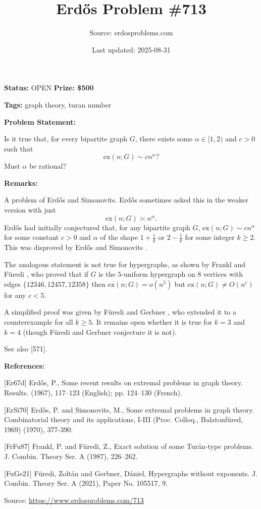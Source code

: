 \documentclass{article}
\title{Erd\H{o}s Problem \#713}
\date{Last updated: 2025-08-31}
\author{Source: erdosproblems.com}
\begin{document}
\maketitle

\noindent\textbf{Status:} OPEN \quad \textbf{Prize: \$500}

\noindent\textbf{Tags:} graph theory, turan number

\medskip
\noindent\textbf{Problem Statement:}

Is it true that, for every bipartite graph $G$, there exists some $\alpha\in [1,2)$ and $c>0$ such that\[\mathrm{ex}(n;G)\sim cn^\alpha?\]Must $\alpha$ be rational?

\bigskip
\noindent\textbf{Remarks:}

A problem of Erd\H{o}s and Simonovits. Erd\H{o}s sometimes asked this in the weaker version with just\[\mathrm{ex}(n;G)\asymp n^{\alpha}.\]Erd\H{o}s \cite{Er67d} had initially conjectured that, for any bipartite graph $G$, $\mathrm{ex}(n;G)\sim cn^{\alpha}$ for some constant $c>0$ and $\alpha$ of the shape $1+\frac{1}{k}$ or $2-\frac{1}{k}$ for some integer $k\geq 2$. This was disproved by Erd\H{o}s and Simonovits \cite{ErSi70}.

The analogous statement is not true for hypergraphs, as shown by Frankl and F\"{u}redi \cite{FrFu87}, who proved that if $G$ is the $5$-uniform hypergraph on $8$ vertices with edges $\{12346,12457,12358\}$ then $\mathrm{ex}(n;G)=o(n^5)$ but $\mathrm{ex}(n;G)\neq O(n^c)$ for any $c<5$.

A simplified proof was given by F\"{u}redi and Gerbner \cite{FuGe21}, who extended it to a counterexample for all $k\geq 5$. It remains open whether it is true for $k=3$ and $k=4$ (though F\"{u}redi and Gerbner conjecture it is not).

See also [571].

\bigskip
\noindent\textbf{References:}

[Er67d] Erd\H{o}s, P., Some recent results on extremal problems in graph theory.
{R}esults. (1967), 117--123 (English); pp. 124--130 (French).
 
 [ErSi70] Erd\H{o}s, P. and Simonovits, M., Some extremal problems in graph theory. Combinatorial theory and its applications, I-III (Proc. Colloq., Balatonf\"{u}red, 1969) (1970), 377-390.
 
 [FrFu87] Frankl, P. and F\"uredi, Z., Exact solution of some Tur\'{a}n-type problems. J. Combin. Theory Ser. A (1987), 226--262.
 
 [FuGe21] F\"uredi, Zolt\'{a}n and Gerbner, D\'{a}niel, Hypergraphs without exponents. J. Combin. Theory Ser. A (2021), Paper No. 105517, 9.

\bigskip
\noindent\small{Source: \url{https://www.erdosproblems.com/713}}
\end{document}
